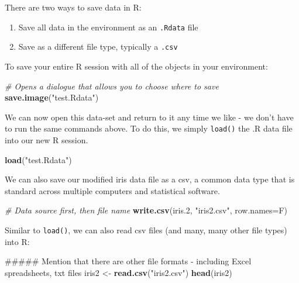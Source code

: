 \documentclass[]{article}
\newenvironment{Shaded}{\begin{snugshade}}{\end{snugshade}}
\newcommand{\KeywordTok}[1]{\textcolor[rgb]{0.13,0.29,0.53}{\textbf{#1}}}
\newcommand{\DataTypeTok}[1]{\textcolor[rgb]{0.13,0.29,0.53}{#1}}
\newcommand{\DecValTok}[1]{\textcolor[rgb]{0.00,0.00,0.81}{#1}}
\newcommand{\StringTok}[1]{\textcolor[rgb]{0.31,0.60,0.02}{#1}}
\newcommand{\CommentTok}[1]{\textcolor[rgb]{0.56,0.35,0.01}{\textit{#1}}}
\newcommand{\NormalTok}[1]{#1}
\providecommand{\tightlist}{%
  \setlength{\itemsep}{0pt}\setlength{\parskip}{0pt}}
\begin{document}
There are two ways to save data in R:

\begin{enumerate}
\def\labelenumi{\arabic{enumi}.}
\tightlist
\item
  Save all data in the environment as an \texttt{.Rdata} file
\item
  Save as a different file type, typically a \texttt{.csv}
\end{enumerate}

To save your entire R session with all of the objects in your
environment:

\begin{Shaded}
\begin{Highlighting}[]
\CommentTok{# Opens a dialogue that allows you to choose where to save}
\KeywordTok{save.image}\NormalTok{(}\StringTok{"test.Rdata"}\NormalTok{)}
\end{Highlighting}
\end{Shaded}

We can now open this data-set and return to it any time we like - we
don't have to run the same commands above. To do this, we simply
\texttt{load()} the .R data file into our new R session.

\begin{Shaded}
\begin{Highlighting}[]
\KeywordTok{load}\NormalTok{(}\StringTok{"test.Rdata"}\NormalTok{)}
\end{Highlighting}
\end{Shaded}

We can also save our modified iris data file as a csv, a common data
type that is standard across multiple computers and statistical
software.

\begin{Shaded}
\begin{Highlighting}[]
\CommentTok{# Data source first, then file name}
\KeywordTok{write.csv}\NormalTok{(iris.}\DecValTok{2}\NormalTok{, }\StringTok{"iris2.csv"}\NormalTok{, }\DataTypeTok{row.names=}\NormalTok{F)}
\end{Highlighting}
\end{Shaded}

Similar to \texttt{load()}, we can also read csv files (and many, many
other file types) into R:

\begin{Shaded}
\begin{Highlighting}[]
\NormalTok{##### Mention that there are other file formats - including Excel spreadsheets, txt files}
\NormalTok{iris2 <-}\StringTok{ }\KeywordTok{read.csv}\NormalTok{(}\StringTok{"iris2.csv"}\NormalTok{)}
\KeywordTok{head}\NormalTok{(iris2)}
\end{Highlighting}
\end{Shaded}
\end{document}
